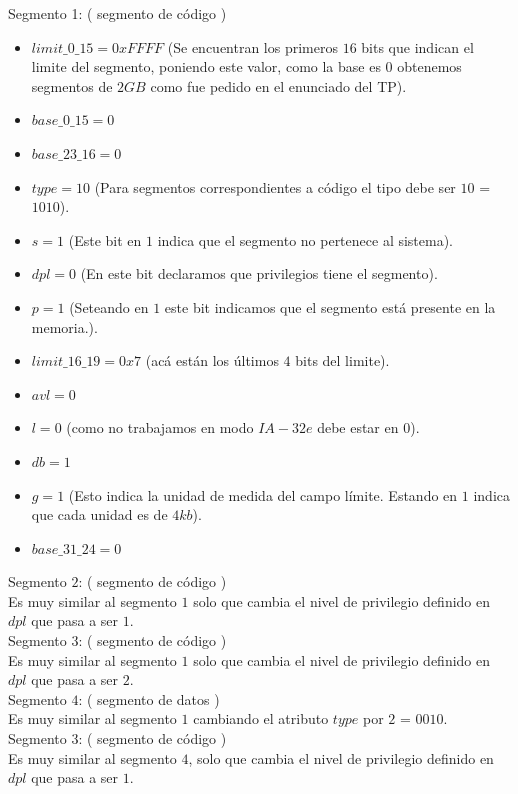 \documentclass[a4paper,10pt,twoside]{article}
\begin{document}
Segmento 1: ( segmento de código )
\begin{itemize}
 \item $limit\_0\_15 = 0xFFFF$ (Se encuentran los primeros $16$ bits que indican el limite del segmento, poniendo este valor, como la base es $0$ obtenemos segmentos de $2GB$ como fue pedido en el enunciado del TP).
 \item $base\_0\_15 = 0$ 
 \item $base\_23\_16 = 0$
 \item $type = 10$ (Para segmentos correspondientes a código el tipo debe ser $10$ = $1010$).
 \item $s = 1$ 	(Este bit en $1$ indica que el segmento no pertenece al sistema).
 \item $dpl = 0$ (En este bit declaramos que privilegios tiene el segmento).
 \item $p = 1$ (Seteando en $1$ este bit indicamos que el segmento está presente en la memoria.).
 \item $limit\_16\_19 = 0x7$ (acá están los últimos $4$ bits del limite).
 \item $avl = 0$
 \item $l = 0$ (como no trabajamos en modo $IA-32e$ debe estar en $0$).
 \item $db = 1$
 \item $g = 1$ (Esto indica la unidad de medida del campo límite. Estando en $1$ indica que cada unidad es de $4kb$).
 \item $base\_31\_24  = 0$
\end{itemize}

Segmento $2$: ( segmento de código ) \\
Es muy similar al segmento $1$ solo que cambia el nivel de privilegio definido en $dpl$ que pasa a ser $1$. \\

Segmento $3$: ( segmento de código ) \\
Es muy similar al segmento $1$ solo que cambia el nivel de privilegio definido en $dpl$ que pasa a ser $2$. \\

Segmento $4$: ( segmento de datos ) \\
Es muy similar al segmento $1$ cambiando el atributo $type$ por $2$ = $0010$. \\

Segmento $3$: ( segmento de código ) \\
Es muy similar al segmento $4$, solo que cambia el nivel de privilegio definido en $dpl$ que pasa a ser $1$. \\
\end{document}
